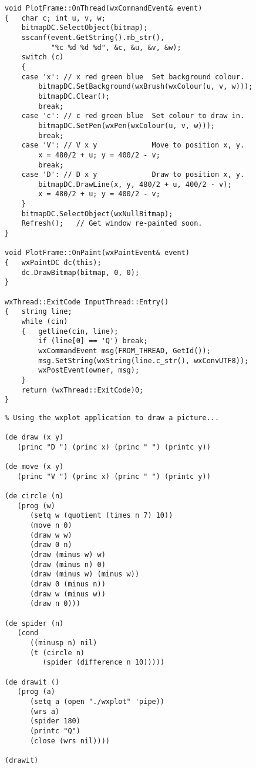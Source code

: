 {\begin{verbatim}
void PlotFrame::OnThread(wxCommandEvent& event)
{   char c; int u, v, w;
    bitmapDC.SelectObject(bitmap);
    sscanf(event.GetString().mb_str(),
           "%c %d %d %d", &c, &u, &v, &w);
    switch (c)
    {
    case 'x': // x red green blue  Set background colour.
        bitmapDC.SetBackground(wxBrush(wxColour(u, v, w)));
        bitmapDC.Clear();
        break;
    case 'c': // c red green blue  Set colour to draw in.
        bitmapDC.SetPen(wxPen(wxColour(u, v, w)));
        break;
    case 'V': // V x y             Move to position x, y.
        x = 480/2 + u; y = 400/2 - v;
        break;
    case 'D': // D x y             Draw to position x, y.
        bitmapDC.DrawLine(x, y, 480/2 + u, 400/2 - v);
        x = 480/2 + u; y = 400/2 - v;
    }
    bitmapDC.SelectObject(wxNullBitmap);
    Refresh();   // Get window re-painted soon.
}

void PlotFrame::OnPaint(wxPaintEvent& event)
{   wxPaintDC dc(this);
    dc.DrawBitmap(bitmap, 0, 0);
}

wxThread::ExitCode InputThread::Entry()
{   string line;
    while (cin)
    {   getline(cin, line);
        if (line[0] == 'Q') break;
        wxCommandEvent msg(FROM_THREAD, GetId());
        msg.SetString(wxString(line.c_str(), wxConvUTF8));
        wxPostEvent(owner, msg);
    }
    return (wxThread::ExitCode)0;
}
\end{verbatim}}
{\small\begin{verbatim}
% Using the wxplot application to draw a picture...

(de draw (x y)
   (princ "D ") (princ x) (princ " ") (printc y))

(de move (x y)
   (princ "V ") (princ x) (princ " ") (printc y))

(de circle (n)
   (prog (w)
      (setq w (quotient (times n 7) 10))
      (move n 0)
      (draw w w)
      (draw 0 n)
      (draw (minus w) w)
      (draw (minus n) 0)
      (draw (minus w) (minus w))
      (draw 0 (minus n))
      (draw w (minus w))
      (draw n 0)))

(de spider (n)
   (cond
      ((minusp n) nil)
      (t (circle n)
         (spider (difference n 10)))))

(de drawit ()
   (prog (a)
      (setq a (open "./wxplot" 'pipe))
      (wrs a)
      (spider 180)
      (printc "Q")
      (close (wrs nil))))

(drawit)
\end{verbatim}}


